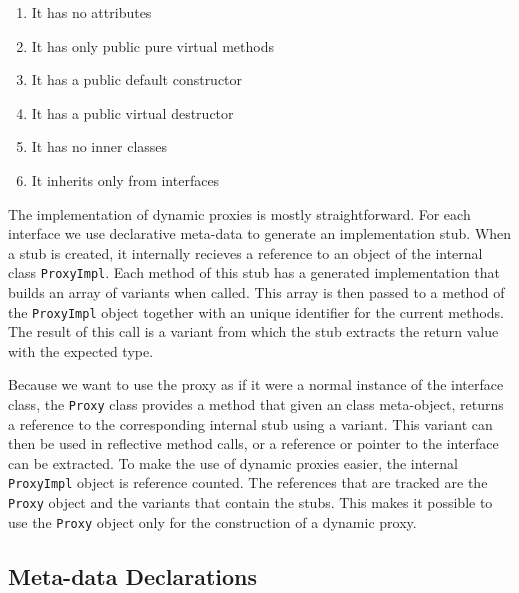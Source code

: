 \begin{enumerate}
 \item It has no attributes
 \item It has only public pure virtual methods
 \item It has a public default constructor
 \item It has a public virtual destructor
 \item It has no inner classes
 \item It inherits only from interfaces
\end{enumerate}

The implementation of dynamic proxies is mostly straightforward. For each interface we use declarative meta-data
to generate an implementation stub. When a stub is created, it internally recieves a reference to an object of
the internal class \texttt{ProxyImpl}. Each method of this stub has a generated implementation that builds
an array of variants when called. This array is then passed to a method of the \texttt{ProxyImpl} object together
with an unique identifier for the current methods. The result of this call is a variant from which the stub
extracts the return value with the expected type.

Because we want to use the proxy as if it were a normal instance of the interface class, the \texttt{Proxy} class
provides a method that given an class meta-object, returns a reference to the corresponding internal stub using a
variant. This variant can then be used in reflective method calls, or a reference or pointer to the interface can
be extracted. To make the use of dynamic proxies easier, the internal \texttt{ProxyImpl} object is reference counted.
The references that are tracked are the \texttt{Proxy} object and the variants that contain the stubs. This makes
it possible to use the \texttt{Proxy} object only for the construction of a dynamic proxy.


\subsection{Meta-data Declarations}

